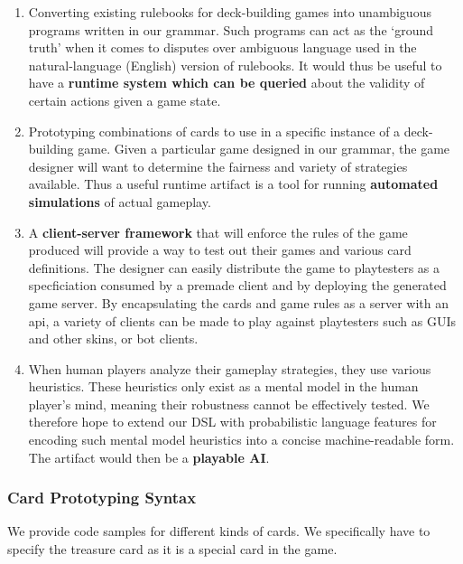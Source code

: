 \documentclass{acm_proc_article-sp}
\begin{document}
\begin{enumerate}
\item Converting existing rulebooks for deck-building games into unambiguous programs written in
our grammar. Such programs can act as the `ground truth' when it comes to disputes over ambiguous
language used in the natural-language (English) version of rulebooks. It would thus be useful to
have a {\bf runtime system which can be queried} about the validity of certain actions given a game state.

\item Prototyping combinations of cards to use in a specific instance of a deck-building game.
Given a particular game designed in our grammar, the game designer will want to determine the
fairness and variety of strategies available. Thus a useful runtime artifact is a tool for
running {\bf automated simulations} of actual gameplay.

\item A {\bf client-server framework} that will enforce the rules of the game
produced will provide a way to test out their games and various card
definitions. The designer can easily distribute the game to playtesters as a
specficiation consumed by a premade client and by deploying the generated game
server. By encapsulating the cards and game rules as a server with an api, a
variety of clients can be made to play against playtesters such as GUIs and
other skins, or bot clients.

\item When human players analyze their gameplay strategies, they use various heuristics.
These heuristics only exist as a mental model in the human player's mind, meaning their
robustness cannot be effectively tested. We therefore hope to extend our DSL with probabilistic
language features for encoding such mental model heuristics into a concise machine-readable form.
The artifact would then be a {\bf playable AI}.

\end{enumerate}

\subsubsection{Card Prototyping Syntax}
We provide code samples for different kinds of cards. We specifically have to specify the
treasure card as it is a special card in the game.
\end{document}
